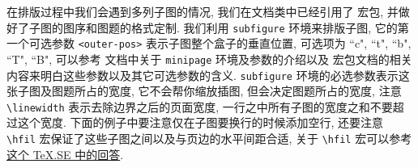 在排版过程中我们会遇到多列子图的情况, 我们在文档类中已经引用了  宏包, 并做好了子图的图序和图题的格式定制. 我们利用 \verb|subfigure| 环境来排版子图, 它的第一个可选参数 \verb|<outer-pos>| 表示子图整个盒子的垂直位置, 可选项为 ``c", ``t", ``b", ``T", ``B", 可以参考  文档中关于 \verb|minipage| 环境及参数的介绍以及  宏包文档的相关内容来明白这些参数以及其它可选参数的含义. \verb|subfigure| 环境的必选参数表示这张子图及图题所占的宽度, 它不会帮你缩放插图, 但会决定图题所占的宽度, 注意\verb|\linewidth| 表示去除边界之后的页面宽度, 一行之中所有子图的宽度之和不要超过这个宽度. 下面的例子中要注意仅在子图要换行的时候添加空行, 还要注意 \verb|\hfil| 宏保证了这些子图之间以及与页边的水平间距合适, 关于 \verb|\hfil| 宏可以参考\href{https://tex.stackexchange.com/a/528921/184559}{这个 TeX.SE 中的回答}.

